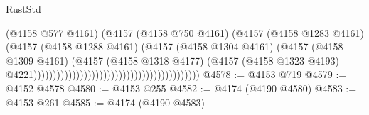 \begin{lexlean}{RustStd}
\begin{coremodule}
                                                                            (@4158 @577 @4161)
                                                                            (@4157
                                                                              (@4158 @750 @4161)
                                                                              (@4157
                                                                                (@4158 @1283 @4161)
                                                                                (@4157
                                                                                  (@4158
                                                                                    @1288
                                                                                    @4161)
                                                                                  (@4157
                                                                                    (@4158
                                                                                      @1304
                                                                                      @4161)
                                                                                    (@4157
                                                                                      (@4158
                                                                                        @1309
                                                                                        @4161)
                                                                                      (@4157
                                                                                        (@4158
                                                                                          @1318
                                                                                          @4177)
                                                                                        (@4157
                                                                                          (@4158
                                                                                            @1323
                                                                                            @4193)
                                                                                          @4221)))))))))))))))))))))))))))))))))))))))))))
@4578 := @4153 @719
@4579 := @4152 @4578
@4580 := @4153 @255
@4582 := @4174 (@4190 @4580)
@4583 := @4153 @261
@4585 := @4174 (@4190 @4583)

\end{coremodule}
\end{lexlean}
